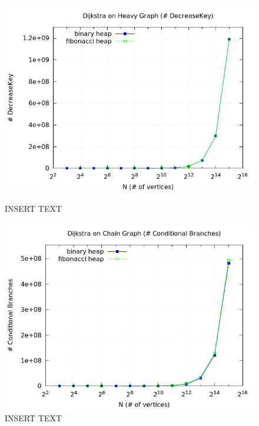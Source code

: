 \documentclass[a4paper,oneside,article,11pt]{memoir}
\begin{document}
\begin{figure}[H]
\centering
\begin{minipage}{0.48\columnwidth}
  \centering
  \includegraphics[width=\linewidth]{../res/dijkstra/d_heavy_dk.png}%
  \caption{INSERT TEXT}
  \label{fig:delmin_2_random_branch}
\end{minipage}%
\hfill
\begin{minipage}{0.48\columnwidth}
  \centering
  \includegraphics[width=\linewidth]{../res/dijkstra/d_chain_br.png}%
  \caption{INSERT TEXT}
  \label{fig:delmin_2_worst_branch}
\end{minipage}
\end{figure}
\end{document}
